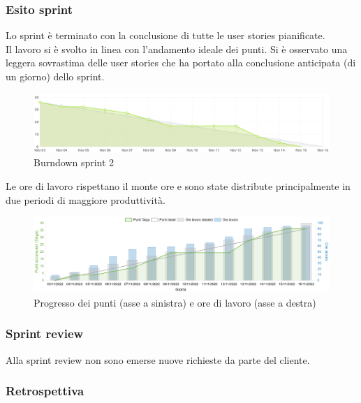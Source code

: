 \newpage
\subsubsection{Esito sprint}
Lo sprint è terminato con la conclusione di tutte le user stories pianificate.\\
Il lavoro si è svolto in linea con l'andamento ideale dei punti. 
Si è osservato una leggera sovrastima delle user stories che ha portato alla conclusione anticipata (di un giorno) dello sprint.\\
\begin{figure}[H]
    \centering
    \includegraphics[width=15cm]{./img/sprint2/burndown.png}
    \caption{Burndown sprint 2}
\end{figure}
Le ore di lavoro rispettano il monte ore e sono state distribute principalmente in due periodi di maggiore produttività.
\begin{figure}[H]
    \centering
    \includegraphics[width=15cm]{./img/sprint2/worktime.png}
    \caption{Progresso dei punti (asse a sinistra) e ore di lavoro (asse a destra)}
\end{figure}


\subsubsection{Sprint review}
Alla sprint review non sono emerse nuove richieste da parte del cliente.


\subsubsection{Retrospettiva} \label{sprint1_retrospettiva}
